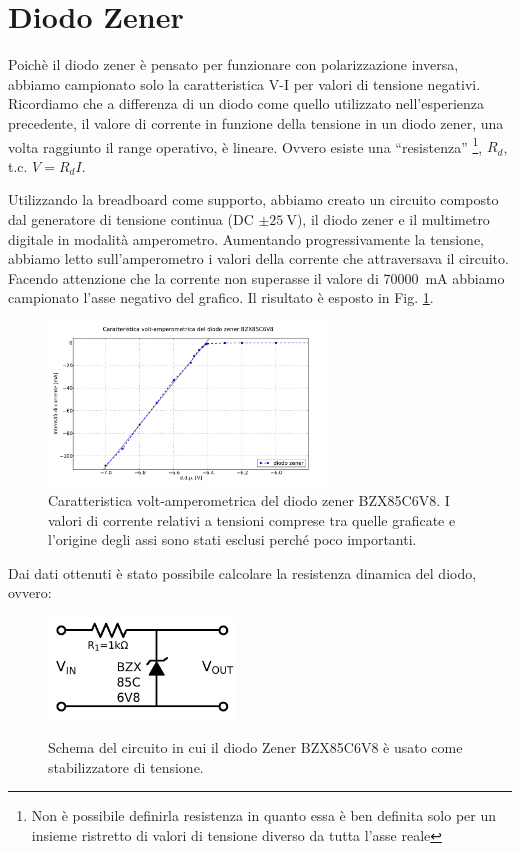 \section{Diodo Zener}
Poichè il diodo zener è pensato per funzionare con polarizzazione inversa, abbiamo campionato solo la caratteristica V-I per valori di tensione negativi. Ricordiamo che a differenza di un diodo come quello utilizzato nell'esperienza precedente, il valore di corrente in funzione della tensione in un diodo zener, una volta raggiunto il range operativo, è lineare. Ovvero esiste una ``resistenza'' \footnote{Non è possibile definirla resistenza in quanto essa è ben definita solo per un insieme ristretto di valori di tensione diverso da tutta l'asse reale}, $R_d$, t.c. $V=R_d I$.

Utilizzando la breadboard come supporto, abbiamo creato un circuito composto dal generatore di tensione continua (DC $\pm \SI{25}{\volt}$), il diodo zener e il multimetro digitale in modalità amperometro. Aumentando progressivamente la tensione, abbiamo letto sull'amperometro i valori della corrente che attraversava il circuito.
Facendo attenzione che la corrente non superasse il valore di \SI{70000}{\milli\ampere} abbiamo campionato l'asse negativo del grafico. Il risultato è esposto in Fig. \ref{fig:VI_zener}.

\begin{figure}[h]
\center
	\includegraphics[width=0.66\textwidth]{VI_zener.pdf}
	\caption{Caratteristica volt-amperometrica del diodo zener BZX85C6V8. I valori di corrente relativi a tensioni comprese tra quelle graficate e l'origine degli assi sono stati esclusi perché poco importanti.}
	\label{fig:VI_zener}
\end{figure}
\newpage
Dai dati ottenuti è stato possibile calcolare la resistenza dinamica del diodo, ovvero:

\begin{figure}
	\caption{Schema del circuito in cui il diodo Zener BZX85C6V8 è usato come stabilizzatore di tensione.}
	\includegraphics[width=50mm]{schema_zener.pdf}
	\label{fig:schema_zener}
\end{figure}

